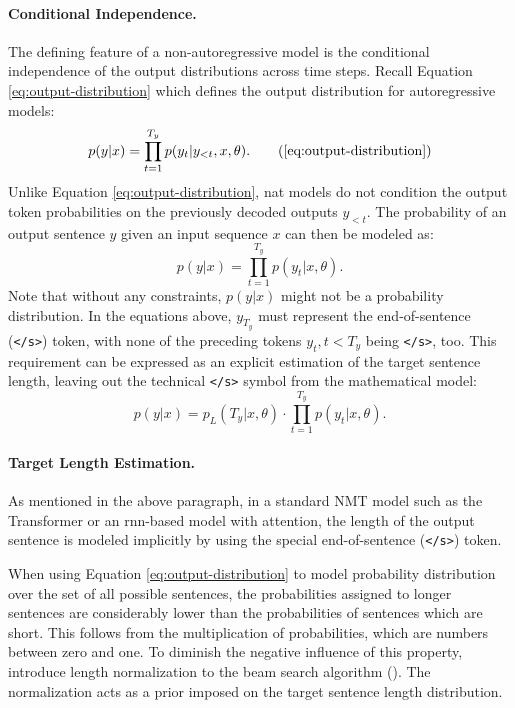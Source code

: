 \paragraph{Conditional Independence.} The defining feature of a
non-autoregressive model is the conditional independence of the output
distributions across time steps. Recall Equation \ref{eq:output-distribution}
which defines the output distribution for autoregressive models:
%
\begin{equation}
  p(y|x) = \prod_{t=1}^{T_y}p(y_t|y_{<t},x,\theta).
  \tag{\ref{eq:output-distribution}}
\end{equation}
%
Unlike Equation \ref{eq:output-distribution}, \Gls{nat} models do not condition
the output token probabilities on the previously decoded outputs $y_{<t}$.  The
probability of an output sentence $y$ given an input sequence $x$ can then be
modeled as:
%
\begin{equation}
  p(y|x) = \prod_{t=1}^{T_y}p(y_t|x,\theta).
  \label{eq:nat-output-distribution}
\end{equation}
%
Note that without any constraints, $p(y|x)$ might not be a probability
distribution. In the equations above, $y_{T_y}$ must represent the
end-of-sentence (\texttt{</s>}) token, with none of the preceding tokens
$y_t, t < T_y$ being \texttt{</s>}, too. This requirement can be expressed as an
explicit estimation of the target sentence length, leaving out the technical
\texttt{</s>} symbol from the mathematical model:
\begin{equation}
  p(y|x) = p_L(T_y|x, \theta) \cdot \prod_{t=1}^{T_y}p(y_t|x,\theta).
  \label{eq:explicit-length}
\end{equation}

\paragraph{Target Length Estimation.} As mentioned in the above paragraph, in a
standard NMT model such as the Transformer or an \acrshort{rnn}-based model with
attention, the length of the output sentence is modeled implicitly by using the
special end-of-sentence (\texttt{</s>}) token. 

When using Equation \ref{eq:output-distribution} to model probability
distribution over the set of all possible sentences, the probabilities assigned
to longer sentences are considerably lower than the probabilities of sentences
which are short. This follows from the multiplication of probabilities, which
are numbers between zero and one.    To diminish the negative influence of this property,
\citet{wu2016google} introduce length normalization to the beam search algorithm
(). The normalization acts as a prior imposed
on the target sentence length distribution.

